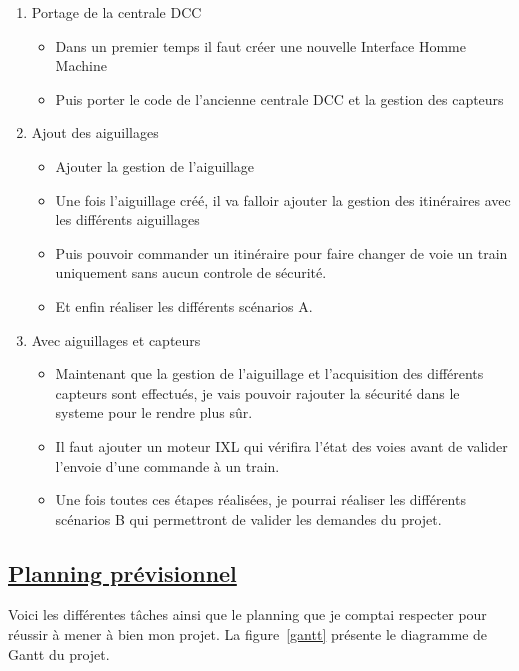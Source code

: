 \begin{enumerate}[1]
  \item Portage de la centrale DCC
  \begin{itemize}
    \item Dans un premier temps il faut cr\'eer une nouvelle Interface
      Homme Machine
    \item Puis porter le code de l'ancienne centrale DCC et la
      gestion des capteurs
  \end{itemize}

  \item Ajout des aiguillages
  \begin{itemize}
    \item Ajouter la gestion de l'aiguillage
    \item Une fois l'aiguillage cr\'e\'e, il va falloir ajouter la
      gestion des itinéraires avec les différents aiguillages
    \item Puis pouvoir commander un itinéraire
      pour faire changer de voie un train uniquement
      sans aucun controle de s\'ecurit\'e.
    \item Et enfin r\'ealiser les diff\'erents sc\'enarios A.
  \end{itemize}

  
  \item Avec aiguillages et capteurs
    \begin{itemize} 
      \item Maintenant que la gestion de l'aiguillage et
        l'acquisition des différents capteurs sont effectués, je vais pouvoir rajouter
        la s\'ecurit\'e dans le systeme pour le rendre plus s\^ur.
      \item Il faut ajouter un moteur IXL\cite{IXL} qui v\'erifira
        l'\'etat des voies avant de valider l'envoie d'une commande \`a
        un train.
      \item Une fois toutes ces étapes réalisées, je pourrai r\'ealiser les
        diff\'erents sc\'enarios B qui permettront de valider les
        demandes du projet.      
    \end{itemize}
\end{enumerate}

\newpage

\subsection{\underline{Planning pr\'evisionnel}}
\label{sec:planning}

Voici les différentes t\^aches ainsi que le planning que je comptai
respecter pour r\'eussir \`a mener \`a bien mon projet. La
figure~\ref{gantt} pr\'esente le diagramme de Gantt du projet.

